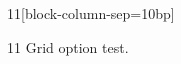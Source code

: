 \documentclass[paper=A4]{ropas-poster}
\begin{document}
\begin{postergrid}{1}{1}[block-column-sep=10bp]
\begin{posterblock}{1}{1}
Grid option test.
\end{posterblock}
\end{postergrid}
\end{document}

